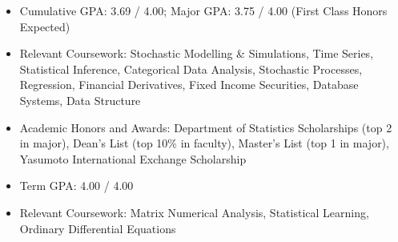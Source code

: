 \documentclass{resume}
\begin{document}
    \address{Wu Yee Sun College, CUHK, Shatin, N.T., Hong Kong SAR}
    \maketitle
    \begin{itemize}
        \item Cumulative GPA: 3.69 / 4.00; Major GPA: 3.75 / 4.00 (First Class Honors Expected)
        \item Relevant Coursework: Stochastic Modelling \& Simulations, Time Series, Statistical Inference, Categorical Data Analysis, Stochastic Processes, Regression, Financial Derivatives, Fixed Income Securities, Database Systems, Data Structure
        \item Academic Honors and Awards: Department of Statistics Scholarships (top 2 in major), Dean's List (top 10\% in faculty), Master's List (top 1 in major), Yasumoto International Exchange Scholarship
    \end{itemize}
    \begin{itemize}
        \item Term GPA: 4.00 / 4.00
        \item Relevant Coursework: Matrix Numerical Analysis, Statistical Learning, Ordinary Differential Equations
    \end{itemize}
\end{document}
